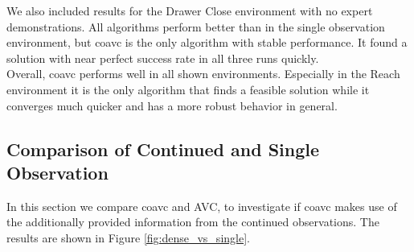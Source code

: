 We also included results for the Drawer Close environment with no expert demonstrations. All algorithms perform better than in the single observation environment, 
but \ac{coavc} is the only algorithm with stable performance. It found a solution with near perfect success rate in all three runs quickly. \\

Overall, \ac{coavc} performs well in all shown environments. Especially in the Reach environment it is the only algorithm that finds a feasible solution while it 
converges much quicker and has a more robust behavior in general. 






\subsection{Comparison of Continued and Single Observation}
\label{sec:com_coavc_avc}
In this section we compare \ac{coavc} and AVC, to investigate if \ac{coavc} makes use of the additionally provided information from the continued observations. 
The results are shown in Figure \ref{fig:dense_vs_single}.\\

